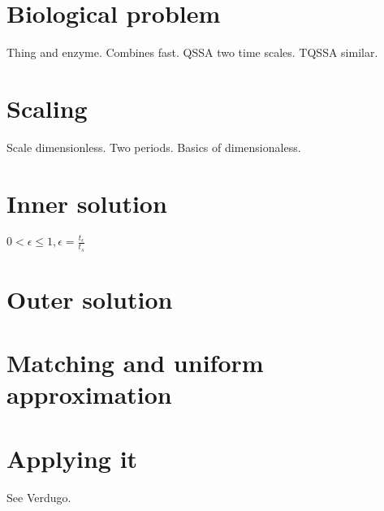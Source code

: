 \documentclass[12pt]{report}
\begin{document}
\section{Biological problem}

Thing and enzyme. Combines fast. QSSA two time scales. TQSSA similar.

\section{Scaling}

Scale dimensionless. Two periods. Basics of dimensionaless.

\section{Inner solution}

$0 < \epsilon \leq 1, \epsilon = \frac{t_{\epsilon}}{t_{s}}$

\section{Outer solution}

\section{Matching and uniform approximation}

\section{Applying it}

See Verdugo.


\end{document}
